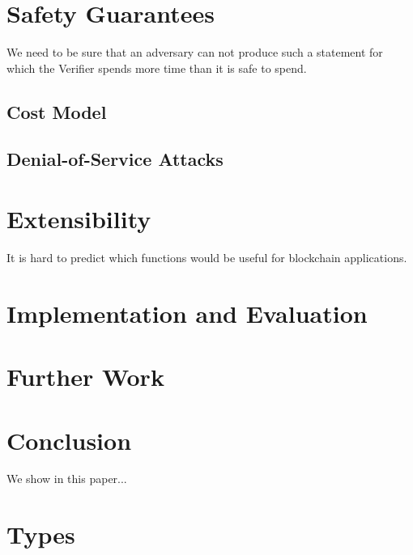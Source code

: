 \documentclass[]{llncs}
\newcommand{\authnote}[2]{\marginpar{\parbox{\marginparwidth}{\tiny %
  \textsf{#1 {\textcolor{blue}{notes: #2}}}}}%
  \textcolor{blue}{\textbf{\dag}}}
\newcommand{\authnote}[2]{
  \textsf{#1 \textcolor{blue}{: #2}}}
\newcommand{\authnote}[2]{}
\newcommand{\knote}[1]{{\authnote{\textcolor{green}{kushti notes}}{#1}}}
\begin{document}
\section{Safety Guarantees}
\label{sec:safety}

We need to be sure that an adversary can not produce such a statement for which the Verifier spends more time than it is safe to spend.
\knote{links to verifier dilemma, orphan rates etc} 

\subsection{Cost Model}
\label{sec:cost-model}

\subsection{Denial-of-Service Attacks}

\section{Extensibility}

It is hard to predict which functions would be useful for blockchain applications.

\section{Implementation and Evaluation}

\section{Further Work}

\section{Conclusion}

We show in this paper...









\appendix

\section{Types}
\end{document}
